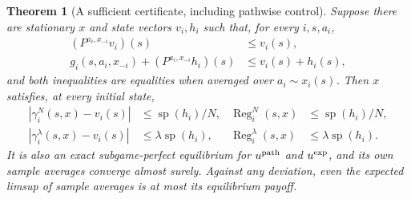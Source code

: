 \documentclass[11pt,a4paper]{article}
\DeclareMathOperator{\Reg}{Reg}
\newtheorem{theorem}{Theorem}[section]
\theoremstyle{definition}
\theoremstyle{remark}
\begin{document}
\begin{theorem}[A sufficient certificate, including pathwise control]
Suppose there are stationary $x$ and state vectors $v_i,h_i$ such that, for every $i,s,a_i$,
\begin{align}
 (P^{a_i,x_{-i}}v_i)(s)&\leq v_i(s),\label{c731-gain}\\
 g_i(s,a_i,x_{-i})+(P^{a_i,x_{-i}}h_i)(s)&\leq v_i(s)+h_i(s),\label{c731-bias}
\end{align}
and both inequalities are equalities when averaged over $a_i\sim x_i(s)$. Then $x$ satisfies, at every initial state,
\begin{align*}
 |\gamma_i^N(s,x)-v_i(s)|&\leq\operatorname{sp}(h_i)/N,
 &\Reg_i^N(s,x)&\leq\operatorname{sp}(h_i)/N,\\
 |\gamma_i^\lambda(s,x)-v_i(s)|&\leq\lambda\operatorname{sp}(h_i),
 &\Reg_i^\lambda(s,x)&\leq\lambda\operatorname{sp}(h_i).
\end{align*}
It is also an exact subgame-perfect equilibrium for $u^{\rm path}$ and $u^{\rm exp}$, and its own sample averages converge almost surely. Against any deviation, even the expected limsup of sample averages is at most its equilibrium payoff.
\end{theorem}
\end{document}
